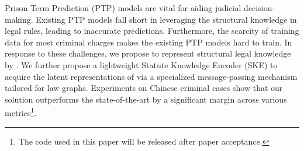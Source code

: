 Prison Term Prediction (PTP) models are vital for aiding judicial decision-making. Existing PTP models fall short in leveraging the structural knowledge in legal rules, leading to inaccurate predictions. Furthermore, the scarcity of training data for most criminal charges makes the existing PTP models hard to train. In response to these challenges, we propose to represent structural legal knowledge by . We further propose a lightweight Statute Knowledge Encoder (SKE) to acquire the latent representations of  via a specialized message-passing mechanism tailored for law graphs. Experiments on Chinese criminal cases show that our solution outperforms the state-of-the-art by a significant margin across various metrics\footnote{The code used in this paper will be released after paper acceptance.}. 

